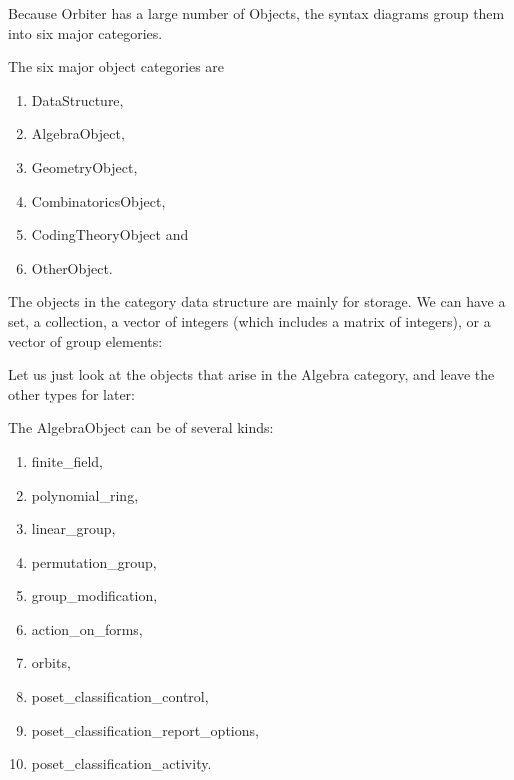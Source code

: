 

\bigskip



Because Orbiter has a large number of Objects, 
the syntax diagrams group them into six major categories.  



The six major object categories are
\begin{enumerate}
\item
DataStructure, 
\item
AlgebraObject, 
\item
GeometryObject, 
\item
CombinatoricsObject, 
\item
CodingTheoryObject and 
\item
OtherObject.
\end{enumerate}


The objects in the category data structure are mainly for storage. 
We can have a set, a collection, a vector of integers (which includes a matrix of integers), 
or a vector of group elements:





Let us just look at the objects that arise in the Algebra category, 
and leave the other types for later:
 








The AlgebraObject can be of several kinds:
\begin{enumerate}
\item
finite\_field,
\item
polynomial\_ring,
\item
linear\_group,
\item
permutation\_group,
\item
group\_modification,
\item
action\_on\_forms,
\item
orbits,
\item
poset\_classification\_control,
\item
poset\_classification\_report\_options,
\item
poset\_classification\_activity.
\end{enumerate}

